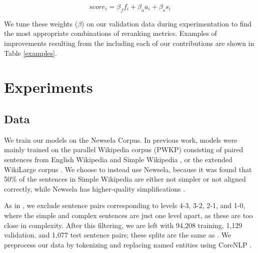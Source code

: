 \documentclass[11pt,a4paper]{article}
\begin{document}
\begin{equation}
    score_i = \beta_ff_i + \beta_aa_i + \beta_ss_i
\end{equation}

\noindent We tune these weights (\textbf{$\beta$}) on our validation data during experimentation to find the most appropriate combinations of reranking metrics. Examples of improvements resulting from the including each of our contributions are shown in Table \ref{examples}.

\section{Experiments}

\subsection{Data} \label{simpdata}

We train our models on the Newsela Corpus. In previous work, models were mainly trained on the parallel Wikipedia corpus (PWKP) consisting of paired sentences from English Wikipedia and Simple Wikipedia \cite{zhu2010monolingual}, or the extended WikiLarge corpus \cite{zhang2017sentence}. We choose to instead use Newsela, because it was found that 50\% of the sentences in Simple Wikipedia are either not simpler or not aligned correctly, while Newsela has higher-quality simplifications \cite{xu2015problems}.

As in , we exclude sentence pairs corresponding to levels 4-3, 3-2, 2-1, and 1-0, where the simple and complex sentences are just one level apart, as these are too close in complexity. After this filtering, we are left with 94,208 training, 1,129 validation, and 1,077 test sentence pairs; these splits are the same as . We preprocess our data by tokenizing and replacing named entities using CoreNLP \cite{manning2014stanford}. 
\end{document}
